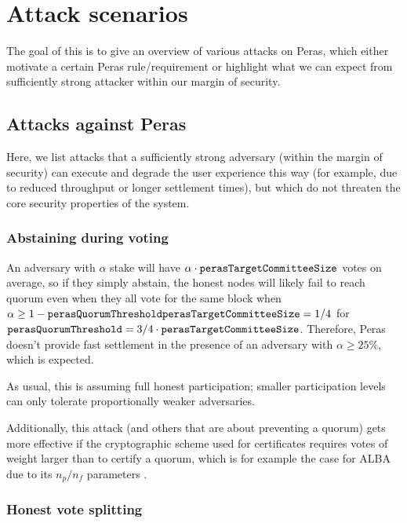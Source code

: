 \chapter{Attack scenarios}\label{chap:attack scenarios}

The goal of this  is to give an overview of various attacks on Peras, which either motivate a certain Peras rule/requirement or highlight what we can expect from sufficiently strong attacker within our margin of security.

\section{Attacks against Peras}

Here, we list attacks that a sufficiently strong adversary (within the margin of security) can execute and degrade the user experience this way (for example, due to reduced throughput or longer settlement times), but which do not threaten the core security properties of the system.

\subsection{Abstaining during voting}\label{sec:abstaining during voting}

An adversary with $\alpha$ stake will have $\alpha\cdot\mathtt{perasTargetCommitteeSize}$ votes on average, so if they simply abstain, the honest nodes will likely fail to reach quorum even when they all vote for the same block when $\alpha \ge 1-\mathtt{perasQuorumThreshold}\mathtt{perasTargetCommitteeSize} = 1/4$ for $\mathtt{perasQuorumThreshold} = 3/4 \cdot \mathtt{perasTargetCommitteeSize}$.
Therefore, Peras doesn't provide fast settlement in the presence of an adversary with $\alpha\ge 25\%$, which is expected.

As usual, this is assuming full honest participation; smaller participation levels can only tolerate proportionally weaker adversaries.

Additionally, this attack (and others that are about preventing a quorum) gets more effective if the cryptographic scheme used for certificates requires votes of weight larger than \perasQuorum{} to certify a quorum, which is for example the case for ALBA due to its $n_p/n_f$ parameters \parencite{chaidos2024approximate}.

\subsection{Honest vote splitting}\label{sec:honest vote splitting}

